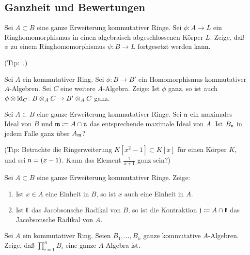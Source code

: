 \subsection{Ganzheit und Bewertungen}

\begin{exercise}
	\label{exer:extension_to_integral_extension}
	Sei \(A \subset B\) eine ganze Erweiterung kommutativer Ringe.
	Sei \(\phi\colon A \to L\) ein Ringhomomorphismus in einen algebraisch
	abgeschlossenen Körper \(L\). Zeige, daß \(\phi\) zu einem
	Ringhomomorphismus \(\psi\colon B \to L\) fortgesetzt werden kann.
	
	(Tip:~.)
\end{exercise}

\begin{exercise}
	Sei \(A\) ein kommutativer Ring.
	Sei \(\phi\colon B \to B'\) ein Homomorphismus kommutativer \(A\)-Algebren.
	Sei \(C\) eine weitere \(A\)-Algebra. Zeige: Ist \(\phi\) ganz, so ist
	auch \(\phi \otimes \operatorname{id}_C\colon B \otimes_A C \to B' \otimes_A C\)
	ganz.
\end{exercise}

\begin{exercise}
	Sei \(A \subset B\) eine ganze Erweiterung kommutativer Ringe. Sei \(\mathfrak{n}\) ein maximales Ideal von \(B\) und \(\mathfrak{m} \coloneqq A \cap
	\mathfrak{n}\) das entsprechende maximale Ideal von \(A\). Ist \(B_{\mathfrak{n}}\)
	in jedem Falle ganz über \(A_{\mathfrak{m}}\)?
	
	(Tip: Betrachte die Ringerweiterung \(K[x^2 - 1] \subset K[x]\) für einen
	Körper \(K\), und sei \(\mathfrak{n} = (x - 1)\). Kann das Element \(\frac
	1 {x + 1}\) ganz sein?)
\end{exercise}

\begin{exercise}
	Sei \(A \subset B\) eine ganze Erweiterung kommutativer Ringe. Zeige:
	\begin{enumerate}
	\item
		Ist \(x \in A\) eine Einheit in \(B\), so ist \(x\) auch eine Einheit
		in \(A\).
	\item
		Ist \(\mathfrak{k}\) das Jacobsonsche Radikal von \(B\), so ist die
		Kontraktion
		\(\mathfrak{j} \coloneqq A \cap \mathfrak{k}\) das Jacobsonsche Radikal von
		\(A\).
	\end{enumerate}
\end{exercise}

\begin{exercise}
	Sei \(A\) ein kommutativer Ring. Seien \(B_1, \dotsc, B_n\) ganze
	kommutative \(A\)-Algebren. Zeige, daß \(\prod\limits_{i = 1}^n B_i\)
	eine ganze \(A\)-Algebra ist.
\end{exercise}

